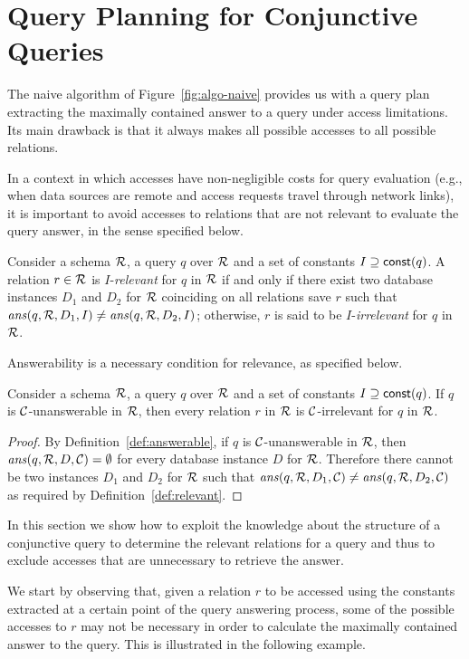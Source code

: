 \section{Query Planning for Conjunctive Queries}
\label{sec:planning}

The naive algorithm of Figure~\ref{fig:algo-naive} provides us with a query plan extracting the maximally contained answer to a query under access limitations. Its main drawback is that it always makes all possible accesses to all possible relations.

In a context in which accesses have non-negligible costs for query evaluation (e.g., when data sources are remote and access requests travel through network links), it is important to avoid accesses to relations that are not relevant to evaluate the query answer, in the sense specified below.

\begin{definition}\label{def:relevant}
    Consider a schema $\mathcal{R}$, a query $q$ over $\mathcal{R}$ and a set of constants $I\supseteq \mbox{\textsf{const}}(q)$.
    A relation $r\in\mathcal{R}$ is $I$-\emph{relevant} for $q$ in $\mathcal{R}$ if and only if there exist two database instances $D_1$ and $D_2$ for $\mathcal{R}$ coinciding on all relations save $r$ such that $\mathit{ans}(q, \mathcal{R},D_1,I)\neq \mathit{ans}(q, \mathcal{R},D_2,I)$; otherwise, $r$ is said to be $I$-\emph{irrelevant} for $q$ in $\mathcal{R}$.
\end{definition}
%
Answerability is a necessary condition for relevance, as specified below.
\begin{proposition}\label{pro:relevant-only-if-answerable}
	Consider a schema $\mathcal{R}$, a query $q$ over $\mathcal{R}$ and a set of constants $I \supseteq \mbox{\textsf{const}}(q)$.
	If $q$ is $\mathcal{C}$-unanswerable in $\mathcal{R}$, then every relation $r$ in $\mathcal{R}$ is $\mathcal{C}$-irrelevant for $q$ in $\mathcal{R}$.
\end{proposition}
\begin{proof}
	By Definition~\ref{def:answerable}, if $q$ is $\mathcal{C}$-unanswerable in $\mathcal{R}$, then $\mathit{ans}(q, \mathcal{R},D,\mathcal{C})=\emptyset$ for every database instance $D$ for $\mathcal{R}$.
	Therefore there cannot be two instances $D_1$ and $D_2$ for $\mathcal{R}$ such that $\mathit{ans}(q, \mathcal{R},D_1,\mathcal{C})\neq \mathit{ans}(q, \mathcal{R},D_2,\mathcal{C})$ as required by Definition~\ref{def:relevant}.
\end{proof}

In this section we show how to exploit the knowledge about the structure of a conjunctive query to determine the relevant relations for a query and thus to exclude accesses that are unnecessary to retrieve the answer.

We start by observing that, given a relation $r$ to be accessed using the constants extracted at a certain point of the query answering process, some of the possible accesses to $r$ may not be necessary in order to calculate the maximally contained answer to the query.  This is illustrated in the following example.

